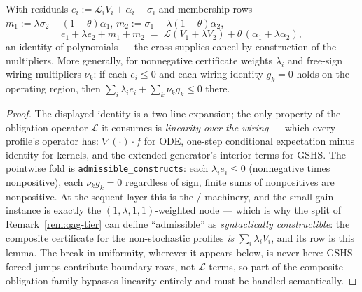\begin{blemma}\label{lem:qag-transport}
With residuals $e_i := \mathcal{L}_i V_i + \alpha_i - \sigma_i$ and
membership rows $m_1 := \lambda\sigma_2 - (1{-}\theta)\alpha_1$,
$m_2 := \sigma_1 - \lambda(1{-}\theta)\alpha_2$,
\[
e_1 + \lambda e_2 + m_1 + m_2
\;=\;
\mathcal{L}(V_1 + \lambda V_2) + \theta\,(\alpha_1 + \lambda\alpha_2),
\]
an identity of polynomials --- the cross-supplies cancel by
construction of the multipliers. More generally, for nonnegative
certificate weights $\lambda_i$ and free-sign wiring multipliers
$\nu_k$: if each $e_i \leq 0$ and each wiring identity $g_k = 0$ holds
on the operating region, then
$\sum_i \lambda_i e_i + \sum_k \nu_k g_k \leq 0$ there.
\end{blemma}
\begin{proof}
The displayed identity is a two-line expansion; the only property of
the obligation operator $\mathcal{L}$ it consumes is \emph{linearity
over the wiring} --- which every profile's operator has:
$\nabla(\cdot) \cdot f$ for ODE, one-step conditional expectation
minus identity for kernels, and the extended generator's interior
terms for GSHS. The pointwise fold is
\texttt{admissible\_constructs}: each $\lambda_i e_i \leq 0$
(nonnegative times nonpositive), each $\nu_k g_k = 0$ regardless of
sign, finite sums of nonpositives are nonpositive. At the sequent
layer this is the / machinery, and
the small-gain instance is exactly the $(1, \lambda, 1, 1)$-weighted
 node --- which is why the split of
Remark~\ref{rem:qag-tier} can define ``admissible'' as
\emph{syntactically constructible}: the composite certificate for the
non-stochastic profiles \emph{is} $\sum_i \lambda_i V_i$, and its row
is this lemma. The break in uniformity, wherever it appears below, is
never here: GSHS forced jumps contribute boundary rows, not
$\mathcal{L}$-terms, so part of the composite obligation family
bypasses linearity entirely and must be handled semantically.
\end{proof}

